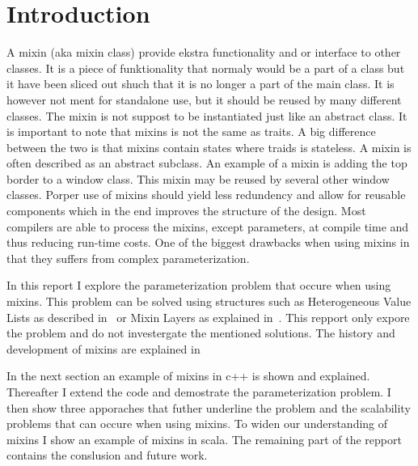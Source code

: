 \section{Introduction}
A mixin (aka mixin class) provide ekstra functionality and or interface to other classes.
It is a piece of funktionality that normaly would be a part of a class but it have been sliced out shuch that it is no longer a part of the main class. 
It is however not ment for standalone use, but it should be reused by many different classes. 
The mixin is not suppost to be instantiated just like an abstract class. 
It is important to note that mixins is not the same as traits. 
A big difference between the two is that mixins contain states where traids is stateless. 
A mixin is often described as an abstract subclass. An example of a mixin is adding the top border to a window class. 
This mixin may be reused by several other window classes.
Porper use of mixins should yield less redundency and allow for reusable components which in the end improves the structure of the design.
Most compilers are able to process the mixins, except parameters, at compile time and thus reducing run-time costs. 
One of the biggest drawbacks when using mixins in that they suffers from complex parameterization.


In this report I explore the parameterization problem that occure when using mixins. 
This problem can be solved using structures such as Heterogeneous Value Lists as described in~\cite[p. 3]{drdobbs} or Mixin Layers as explained in~\cite{Smaragdakis:2000:MPC:645417.652070}. 
This repport only expore the problem and do not investergate the mentioned solutions. 
The history and development of mixins are explained in~\cite[Introduction]{Bracha:1990:MI:97946.97982}


In the next section an example of mixins in c++ is shown and explained. 
Thereafter I extend the code and demostrate the parameterization problem.
I then show three apporaches that futher underline the problem and the scalability problems that can occure when using mixins.
To widen our understanding of mixins I show an example of mixins in scala. 
The remaining part of the repport contains the conslusion and future work. 






